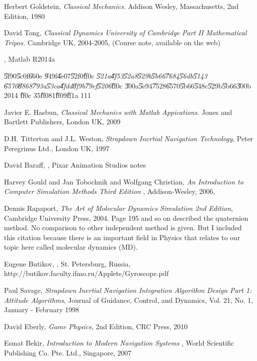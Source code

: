 \documentclass[12pt,a4paper]{article}
\begin{document}
\begin{thebibliography}{99}
 Herbert Goldstein, \emph{Classical Mechanics}. Addison
Wesley, Massachusetts, 2nd Edition, 1980

 David Tong, \emph{Classical Dynamics University of Cambridge
Part II Mathematical Tripos.} Cambridge UK, 2004-2005, (Course note,
available on the web)

 \href{http://www.mathworks.com/help/matlab/ordinary-differential-equations.html%
}{\underline{\color{blue}%
}}, Matlab R2014a

 \U{5f90}\U{5c0f}\U{660e} \U{949f}\U{4e07}\U{52f0}\U{ff0c}%
\textit{\U{521a}\U{4f53}\U{52a8}\U{529b}\U{5b66}\U{7684}\U{56db}\U{5143}%
\U{6570}\U{8868}\U{793a}\U{53ca}\U{4fdd}\U{8f9b}\U{79ef}\U{5206}}\U{ff0c}%
\U{300a}\U{5e94}\U{7528}\U{6570}\U{5b66}\U{548c}\U{529b}\U{5b66}\U{300b} 2014%
\U{ff0c} 35\U{ff08}1\U{ff09}\U{ff1a} 111

 Javier E. Hasbun, \emph{Classical Mechanics with Matlab
Appications.} Jones and Bartlett Publishers, London UK, 2009

 D.H. Titterton and J.L. Weston, \emph{Strapdown Inertial
Navigation Technology}, Peter Peregrinus Ltd., London UK, 1997

 David Baraff\textit{, }\href{http://graphics.cs.cmu.edu/courses/15-869-F08/lec/14/notesg.pdf%
}{\underline{\color{blue}%
}}, Pixar Animation Studios notes

 Harvey Gould and Jan Tobochnik and Wolfgang
Christian, \emph{An Introduction to Computer Simulation Methods Third Edition%
}, Addison-Wesley, 2006, \href{http://www.opensourcephysics.org/items/detail.cfm?ID=7375%
}{\underline{\color{blue}}}

 Dennis Rapaport, \emph{The Art of Molecular Dynamics
Simulation 2nd Edition}, Cambridge University Press, 2004. Page 195 and so
on described the quaternion method. No comparison to other independent
method is given. But I included this citation because there is an important
field in Physics that relates to our topic here called molecular dynamics
(MD).

 Eugene Butikov, \href{http://butikov.faculty.ifmo.ru/Applets/Gyroscope.pdf%
}{\underline{\color{blue}}},
St. Petersburg, Russia, http://butikov.faculty.ifmo.ru/Applets/Gyroscope.pdf

 Paul Savage, \emph{Strapdown Inertial Navigation
Integration Algorithm Design Part 1: Attitude Algorithms}, Journal of
Guidance, Control, and Dynamics, Vol. 21, No. 1, January - February 1998

 David Eberly, \emph{Game Physics,} 2nd Edition, CRC Press,
2010

 Esmat Bekir, \emph{Introduction to Modern Navigation Systems}%
, World Scientific Publishing Co. Pte. Ltd., Singapore, 2007
\end{thebibliography}
\end{document}
